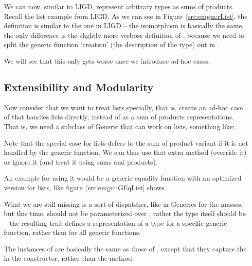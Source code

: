 We can now, similar to  LIGD, represent arbitrary types as sums of products.
Recall the list example from LIGD.
As we can see in Figure~\ref{src:emgm:rList}, the definition is similar to
the one in LIGD
-- the isomorphism is basically the same, the only difference is the slightly
more verbose definition of , because we need to split the generic
function `creation' (the description of the type) out in .

We will see that this only gets worse once we introduce ad-hoc cases.


\subsection{Extensibility and Modularity}
Now consider that we want to treat lists specially, that is, create an
ad-hoc case of  that handles lists directly, instead of as a
sum of products representations. That is, we need a subclass of Generic
that can work on lists, something like:

Note that the special case for lists defers to the sum of product variant
if it is not handled by the generic function. We can thus use that extra
method (override it) or ignore it (and treat it using sums and products).

An example for using it would be a generic equality function with an optimized
version for lists, like figure~\ref{src:emgm:GEqList} shows.


What we are still missing is a sort of dispatcher, like  in Generics
for the masses, but this time,  should not be parameterized over ,
rather the type itself should be -- the resulting  trait defines a
representation of a type for a specific generic function, rather than for all
generic functions.


The instances of  are basically the same as those of , except
that they capture the  in the constructor, rather than the
method.



